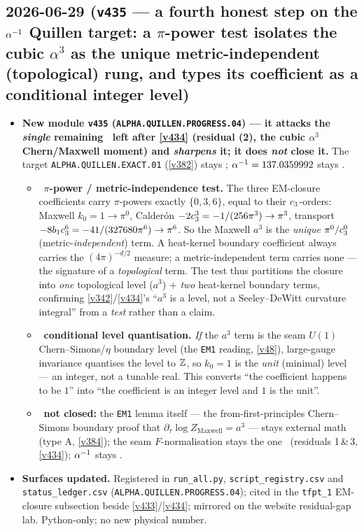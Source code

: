 \subsection*{2026-06-29 (\texttt{v435} --- a fourth honest step on the $\alpha^{-1}$ Quillen target: a $\pi$-power test isolates the cubic $\alpha^3$ as the unique metric-independent (topological) rung, and types its coefficient as a conditional integer level)}
\begin{itemize}
\item \textbf{New module \texttt{v435} (\texttt{ALPHA.QUILLEN.PROGRESS.04}) --- it attacks the \emph{single}
remaining \mO\ left after \vref{v434} (residual (2), the cubic $\alpha^3$ Chern/Maxwell moment) and
\emph{sharpens} it; it does \emph{not} close it.} The target \texttt{ALPHA.QUILLEN.EXACT.01} (\vref{v382})
stays \mO; $\alpha^{-1}=137.0359992$ stays \mE.
\begin{itemize}
\item \mE\ \textbf{$\pi$-power / metric-independence test.} The three EM-closure coefficients carry
$\pi$-powers exactly $\{0,3,6\}$, equal to their $c_3$-orders: Maxwell $k_0=1\to\pi^0$, Calder\'on
$-2c_3^3=-1/(256\pi^3)\to\pi^3$, transport $-8b_1c_3^6=-41/(327680\pi^6)\to\pi^6$. So the Maxwell
$a^3$ is the \emph{unique} $\pi^0/c_3^0$ (metric-\emph{independent}) term. A heat-kernel boundary
coefficient always carries the $(4\pi)^{-d/2}$ measure; a metric-independent term carries none --- the
signature of a \emph{topological} term. The test thus partitions the closure into \emph{one} topological
level ($a^3$) $+$ \emph{two} heat-kernel boundary terms, confirming \vref{v342}/\vref{v434}'s ``$a^3$ is a
level, not a Seeley--DeWitt curvature integral'' from a \emph{test} rather than a claim.
\item \mC\ \textbf{conditional level quantisation.} \emph{If} the $a^3$ term is the seam $U(1)$
Chern--Simons/$\eta$ boundary level (the \texttt{EM1} reading, \vref{v48}), large-gauge invariance
quantises the level to $\mathbb{Z}$, so $k_0=1$ is the \emph{unit} (minimal) level --- an integer, not a tunable
real. This converts ``the coefficient happens to be $1$'' into ``the coefficient is an integer level and
$1$ is the unit''.
\item \mO\ \textbf{not closed:} the \texttt{EM1} lemma itself --- the from-first-principles Chern--Simons
boundary proof that $\partial_\tau\log Z_{\mathrm{Maxwell}}=a^3$ --- stays external math (type A, \vref{v384});
the seam $F$-normalisation stays the one \mC\ (residuals 1\,\&\,3, \vref{v434}); $\alpha^{-1}$ stays \mE.
\end{itemize}
\item \textbf{Surfaces updated.} Registered in \texttt{run\_all.py}, \texttt{script\_registry.csv} and
\texttt{status\_ledger.csv} (\texttt{ALPHA.QUILLEN.PROGRESS.04}); cited in the \texttt{tfpt\_1} EM-closure
subsection beside \vref{v433}/\vref{v434}; mirrored on the website residual-gap lab. Python-only; no new
physical number.
\end{itemize}

